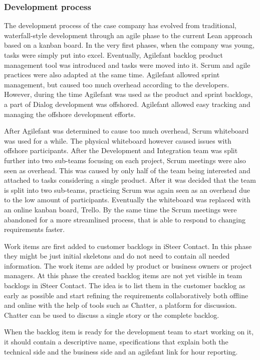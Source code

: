 \documentclass[english, grading]{tktltiki2}
\theoremstyle{definition}
\theoremstyle{remark}
\begin{document}
\subsubsection{Development process}
The development process of the case company has evolved from traditional, waterfall-style development through an agile phase to the current Lean approach based on a kanban board. In the very first phases, when the company was young, tasks were simply put into excel. Eventually, Agilefant backlog product management tool was introduced and tasks were moved into it. Scrum and agile practices were also adapted at the same time. Agilefant allowed sprint management, but caused too much overhead according to the developers. However, during the time Agilefant was used as the product and sprint backlogs, a part of Dialog development was offshored. Agilefant allowed easy tracking and managing the offshore development efforts.

After Agilefant was determined to cause too much overhead, Scrum whiteboard was used for a while. The physical whiteboard however caused issues with offshore participants. After the Development and Integration team was split further into two sub-teams focusing on each project, Scrum meetings were also seen as overhead. This was caused by only half of the team being interested and attached to tasks considering a single product. After it was decided that the team is split into two sub-teams, practicing Scrum was again seen as an overhead due to the low amount of participants. Eventually the whiteboard was replaced with an online kanban board, Trello. By the same time the Scrum meetings were abandoned for a more streamlined process, that is able to respond to changing requirements faster. 

Work items are first added to customer backlogs in iSteer Contact. In this phase they might be just initial skeletons and do not need to contain all needed information. The work items are added by product or business owners or project managers. At this phase the created backlog items are not yet visible in team backlogs in iSteer Contact. The idea is to list them in the customer backlog as early as possible and start refining the requirements collaboratively both offline and online with the help of tools such as Chatter, a platform for discussion. Chatter can be used to discuss a single story or the complete backlog.

When the backlog item is ready for the development team to start working on it, it should contain a descriptive name, specifications that explain both the technical side and the business side and an agilefant link for hour reporting.
\end{document}
